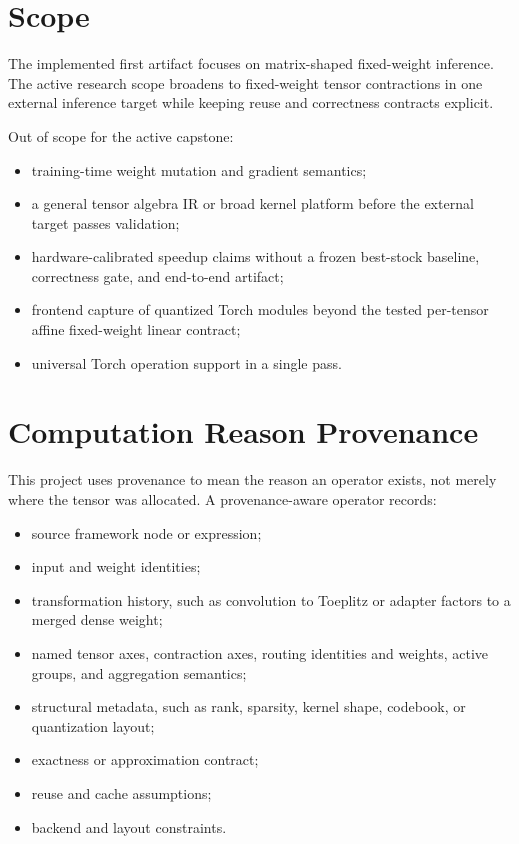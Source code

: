\documentclass[11pt]{article}
\begin{document}
\section{Scope}

The implemented first artifact focuses on matrix-shaped fixed-weight inference.
The active research scope broadens to fixed-weight tensor contractions in one
external inference target while keeping reuse and correctness contracts
explicit.

Out of scope for the active capstone:

\begin{itemize}
  \item training-time weight mutation and gradient semantics;
  \item a general tensor algebra IR or broad kernel platform before the external
  target passes validation;
  \item hardware-calibrated speedup claims without a frozen best-stock baseline,
  correctness gate, and end-to-end artifact;
  \item frontend capture of quantized Torch modules beyond the tested
  per-tensor affine fixed-weight linear contract;
  \item universal Torch operation support in a single pass.
\end{itemize}

\section{Computation Reason Provenance}

This project uses provenance to mean the reason an operator exists, not merely
where the tensor was allocated. A provenance-aware operator records:

\begin{itemize}
  \item source framework node or expression;
  \item input and weight identities;
  \item transformation history, such as convolution to Toeplitz or adapter
  factors to a merged dense weight;
  \item named tensor axes, contraction axes, routing identities and weights,
  active groups, and aggregation semantics;
  \item structural metadata, such as rank, sparsity, kernel shape, codebook, or
  quantization layout;
  \item exactness or approximation contract;
  \item reuse and cache assumptions;
  \item backend and layout constraints.
\end{itemize}
\end{document}
